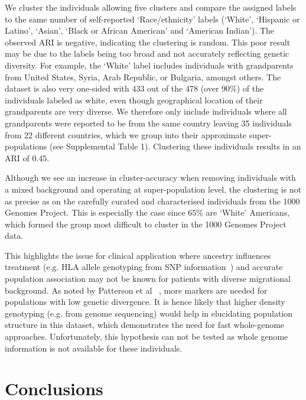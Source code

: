 \documentclass{bmcart}
\begin{document}
We cluster the individuals allowing five clusters and compare the assigned labels to the same number of self-reported `Race/ethnicity' labels (`White', `Hispanic or Latino', `Asian', `Black or African American' and `American Indian').
The observed ARI is negative, indicating the clustering is random. 
This poor result may be due to the labels being too broad and not accurately reflecting genetic diversity. For example, the `White' label includes individuals with grandparents from United States, Syria, Arab Republic, or Bulgaria, amongst others. 
The dataset is also very one-sided with 433 out of the 478 (over 90\%) of the individuals labeled as white, even though geographical location of their grandparents are very diverse.
We therefore only include individuals where all grandparents were reported to be from the same country leaving 35 individuals from 22 different countries, which we group into their approximate super-populations (see Supplemental Table 1). 
Clustering these individuals results in an ARI of 0.45. 

Although we see an increase in cluster-accuracy when removing individuals with a mixed background and operating at super-population level, the clustering is not as precise as on the carefully curated and characterised individuals from the 1000 Genomes Project.
This is especially the case since 65\% are `White' Americans, which formed the group most difficult to cluster in the 1000 Genomes Project data.

This highlights the issue for clinical application where ancestry influences treatment (e.g. HLA allele genotyping from SNP information~\cite{Zheng2014}) and accurate population association may not be known for patients with diverse migrational background.
As noted by Patterson et al ~\cite{Patterson2006}, more markers are needed for populations with low genetic divergence. 
It is hence likely that higher density genotyping (e.g. from genome sequencing) would help in elucidating population structure in this dataset, which demonstrates the need for fast whole-genome approaches. 
Unfortunately, this hypothesis can not be tested as whole genome information is not available for these individuals. 




\section*{Conclusions}
\end{document}
